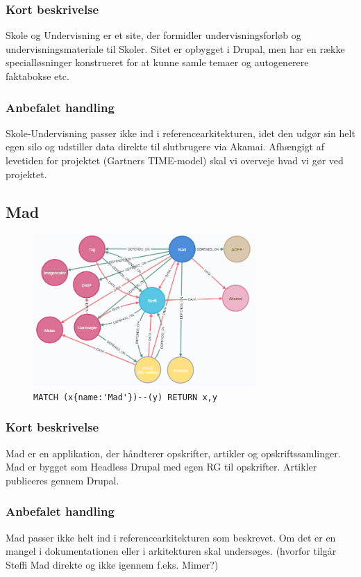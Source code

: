 \documentclass{article}
\begin{document}
\subsubsection*{Kort beskrivelse}
Skole og Undervisning er et site, der formidler undervisningsforløb og undervisningsmateriale til Skoler.  Sitet er opbygget i Drupal, men har en række specialløsninger konstrueret for at kunne samle temaer og autogenerere faktabokse etc. 
\subsubsection*{Anbefalet handling}
Skole-Undervisning passer ikke ind i referencearkitekturen, idet den udgør sin helt egen silo og udstiller data direkte til slutbrugere via Akamai. 
Afhængigt af levetiden for projektet (Gartners TIME-model) skal vi overveje hvad vi gør ved projektet.


\subsection{Mad}
\begin{figure}[H]
\includegraphics[width=240pt]{Mad.PNG}
\cprotect\caption{\verb|MATCH (x{name:'Mad'})--(y) RETURN x,y|}
\end{figure}
\subsubsection*{Kort beskrivelse}
Mad er en applikation, der håndterer opskrifter, artikler og opskriftssamlinger. Mad er bygget som Headless Drupal med egen RG til opskrifter. Artikler publiceres gennem Drupal. 
\subsubsection*{Anbefalet handling}
Mad passer ikke helt ind i referencearkitekturen som beskrevet. Om det er en mangel i dokumentationen eller i arkitekturen skal undersøges. (hvorfor tilgår Steffi Mad direkte og ikke igennem f.eks. Mimer?)
\end{document}
